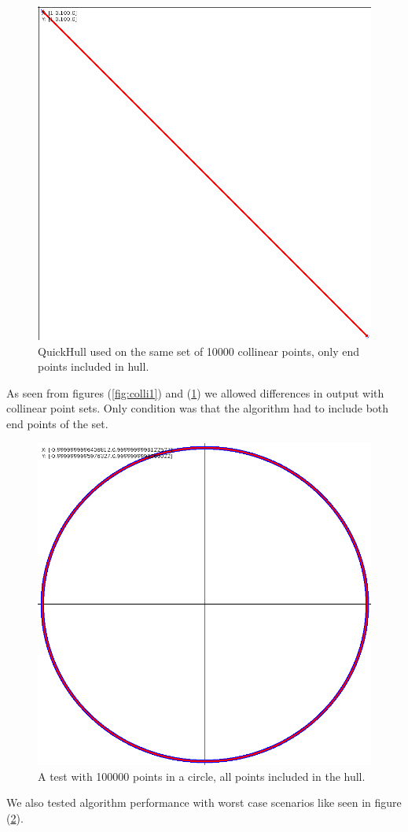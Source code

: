 \documentclass[a4paper,12pt,leqno,titlepage]{article}
\begin{document}
\begin{figure}[t!]
\caption{QuickHull used on the same set of 10000 collinear points, only end points included in hull.} %
\label{fig:colli2}
\centering
\includegraphics[width=.6\textwidth]{line10000-2.png}
\end{figure}

\clearpage
\pagebreak

As seen from figures (\ref{fig:colli1}) and (\ref{fig:colli2}) we allowed differences in output with collinear point sets. Only condition was that the algorithm had to include both end points of the set.

\begin{figure}[h!]
\caption{A test with 100000 points in a circle, all points included in the hull.} %
\label{fig:circle}
\centering
\includegraphics[width=\textwidth]{circle100000.png}
\end{figure}

We also tested algorithm performance with worst case scenarios like seen in figure (\ref{fig:circle}).
\end{document}
